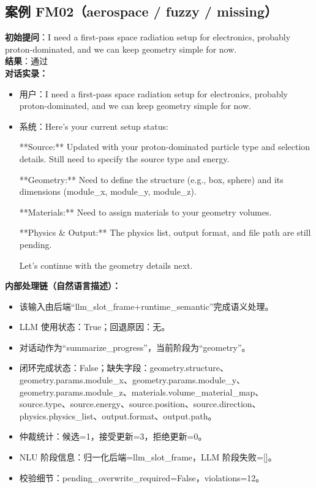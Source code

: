 \documentclass[11pt]{ctexart}
\begin{document}
\subsection{案例 FM02（aerospace / fuzzy / missing）}
\textbf{初始提问}：I need a first-pass space radiation setup for electronics, probably proton-dominated, and we can keep geometry simple for now.\\
\textbf{结果}：通过\\
\textbf{对话实录：}
\begin{itemize}
\item 用户：I need a first-pass space radiation setup for electronics, probably proton-dominated, and we can keep geometry simple for now.
\item 系统：Here's your current setup status:

**Source:** Updated with your proton-dominated particle type and selection details. Still need to specify the source type and energy.

**Geometry:** Need to define the structure (e.g., box, sphere) and its dimensions (module\_x, module\_y, module\_z).

**Materials:** Need to assign materials to your geometry volumes.

**Physics \& Output:** The physics list, output format, and file path are still pending.

Let's continue with the geometry details next.
\end{itemize}
\textbf{内部处理链（自然语言描述）：}
\begin{itemize}
\item 该输入由后端“llm\_slot\_frame+runtime\_semantic”完成语义处理。
\item LLM 使用状态：True；回退原因：无。
\item 对话动作为“summarize\_progress”，当前阶段为“geometry”。
\item 闭环完成状态：False；缺失字段：geometry.structure、geometry.params.module\_x、geometry.params.module\_y、geometry.params.module\_z、materials.volume\_material\_map、source.type、source.energy、source.position、source.direction、physics.physics\_list、output.format、output.path。
\item 仲裁统计：候选=1，接受更新=3，拒绝更新=0。
\item NLU 阶段信息：归一化后端=llm\_slot\_frame，LLM 阶段失败=[]。
\item 校验细节：pending\_overwrite\_required=False，violations=12。
\end{itemize}
\end{document}
